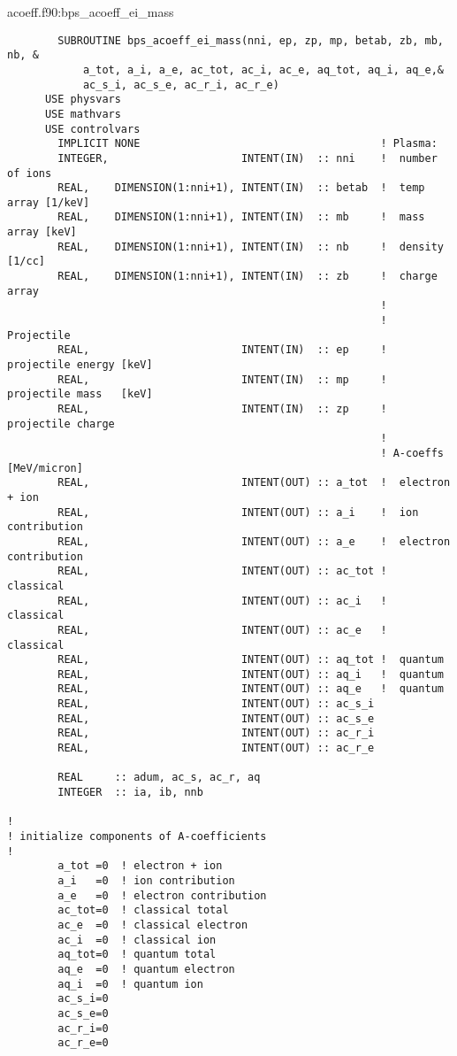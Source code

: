 \documentclass[preprint,12pt,eqsecnum,nofootinbib,amsmath,amssymb]{revtex4}
\begin{document}
{\vskip0.4cm 
\noindent
acoeff.f90:bps\_acoeff\_ei\_mass
{
\baselineskip 10pt
\begin{verbatim}
        SUBROUTINE bps_acoeff_ei_mass(nni, ep, zp, mp, betab, zb, mb, nb, &
            a_tot, a_i, a_e, ac_tot, ac_i, ac_e, aq_tot, aq_i, aq_e,&
            ac_s_i, ac_s_e, ac_r_i, ac_r_e)
      USE physvars
      USE mathvars    
      USE controlvars  
        IMPLICIT NONE                                      ! Plasma:
        INTEGER,                     INTENT(IN)  :: nni    !  number of ions
        REAL,    DIMENSION(1:nni+1), INTENT(IN)  :: betab  !  temp array [1/keV]
        REAL,    DIMENSION(1:nni+1), INTENT(IN)  :: mb     !  mass array [keV]
        REAL,    DIMENSION(1:nni+1), INTENT(IN)  :: nb     !  density [1/cc]
        REAL,    DIMENSION(1:nni+1), INTENT(IN)  :: zb     !  charge array
                                                           !
                                                           ! Projectile  
        REAL,                        INTENT(IN)  :: ep     !  projectile energy [keV]
        REAL,                        INTENT(IN)  :: mp     !  projectile mass   [keV]
        REAL,                        INTENT(IN)  :: zp     !  projectile charge
                                                           !
                                                           ! A-coeffs [MeV/micron]
        REAL,                        INTENT(OUT) :: a_tot  !  electron + ion
        REAL,                        INTENT(OUT) :: a_i    !  ion contribution
        REAL,                        INTENT(OUT) :: a_e    !  electron contribution
        REAL,                        INTENT(OUT) :: ac_tot !  classical
        REAL,                        INTENT(OUT) :: ac_i   !  classical
        REAL,                        INTENT(OUT) :: ac_e   !  classical
        REAL,                        INTENT(OUT) :: aq_tot !  quantum
        REAL,                        INTENT(OUT) :: aq_i   !  quantum
        REAL,                        INTENT(OUT) :: aq_e   !  quantum
        REAL,                        INTENT(OUT) :: ac_s_i
        REAL,                        INTENT(OUT) :: ac_s_e 
        REAL,                        INTENT(OUT) :: ac_r_i
        REAL,                        INTENT(OUT) :: ac_r_e

        REAL     :: adum, ac_s, ac_r, aq
        INTEGER  :: ia, ib, nnb

!
! initialize components of A-coefficients
!
        a_tot =0  ! electron + ion
        a_i   =0  ! ion contribution
        a_e   =0  ! electron contribution
        ac_tot=0  ! classical total
        ac_e  =0  ! classical electron
        ac_i  =0  ! classical ion
        aq_tot=0  ! quantum total
        aq_e  =0  ! quantum electron
        aq_i  =0  ! quantum ion
        ac_s_i=0 
        ac_s_e=0 
        ac_r_i=0
        ac_r_e=0


\end{verbatim}}}
\end{document}
